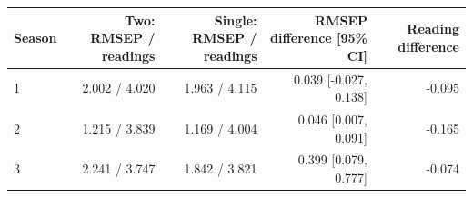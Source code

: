 \begin{tabular}{lrrrr}
\toprule
Season & Two: RMSEP / readings & Single: RMSEP / readings & RMSEP difference [95\% CI] & Reading difference \\
\midrule
1 & 2.002 / 4.020 & 1.963 / 4.115 & 0.039 [-0.027, 0.138] & -0.095 \\
2 & 1.215 / 3.839 & 1.169 / 4.004 & 0.046 [0.007, 0.091] & -0.165 \\
3 & 2.241 / 3.747 & 1.842 / 3.821 & 0.399 [0.079, 0.777] & -0.074 \\
\bottomrule
\end{tabular}
